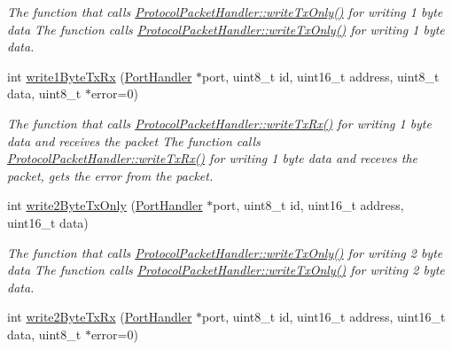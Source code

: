 \begin{DoxyCompactItemize}
\begin{DoxyCompactList}\small\item\em The function that calls \hyperlink{classmercury_1_1_protocol_packet_handler_adf6e96b412135484dac0ff7ff9c2bf36}{Protocol\+Packet\+Handler\+::write\+Tx\+Only()} for writing 1 byte data  The function calls \hyperlink{classmercury_1_1_protocol_packet_handler_adf6e96b412135484dac0ff7ff9c2bf36}{Protocol\+Packet\+Handler\+::write\+Tx\+Only()} for writing 1 byte data. \end{DoxyCompactList}\item 
int \hyperlink{classmercury_1_1_protocol_packet_handler_a707d577c37240db5de018f154a9a0fec}{write1\+Byte\+Tx\+Rx} (\hyperlink{classmercury_1_1_port_handler}{Port\+Handler} $\ast$port, uint8\+\_\+t id, uint16\+\_\+t address, uint8\+\_\+t data, uint8\+\_\+t $\ast$error=0)
\begin{DoxyCompactList}\small\item\em The function that calls \hyperlink{classmercury_1_1_protocol_packet_handler_a13921f2ddae0c1f1f7ac3669d1a15470}{Protocol\+Packet\+Handler\+::write\+Tx\+Rx()} for writing 1 byte data and receives the packet  The function calls \hyperlink{classmercury_1_1_protocol_packet_handler_a13921f2ddae0c1f1f7ac3669d1a15470}{Protocol\+Packet\+Handler\+::write\+Tx\+Rx()} for writing 1 byte data and receves the packet,  gets the error from the packet. \end{DoxyCompactList}\item 
int \hyperlink{classmercury_1_1_protocol_packet_handler_a80a1fe6d22afe8878b23d123e2c77070}{write2\+Byte\+Tx\+Only} (\hyperlink{classmercury_1_1_port_handler}{Port\+Handler} $\ast$port, uint8\+\_\+t id, uint16\+\_\+t address, uint16\+\_\+t data)
\begin{DoxyCompactList}\small\item\em The function that calls \hyperlink{classmercury_1_1_protocol_packet_handler_adf6e96b412135484dac0ff7ff9c2bf36}{Protocol\+Packet\+Handler\+::write\+Tx\+Only()} for writing 2 byte data  The function calls \hyperlink{classmercury_1_1_protocol_packet_handler_adf6e96b412135484dac0ff7ff9c2bf36}{Protocol\+Packet\+Handler\+::write\+Tx\+Only()} for writing 2 byte data. \end{DoxyCompactList}\item 
int \hyperlink{classmercury_1_1_protocol_packet_handler_a59919f414dc8f1b0d024af5df3189294}{write2\+Byte\+Tx\+Rx} (\hyperlink{classmercury_1_1_port_handler}{Port\+Handler} $\ast$port, uint8\+\_\+t id, uint16\+\_\+t address, uint16\+\_\+t data, uint8\+\_\+t $\ast$error=0)

\end{DoxyCompactItemize}
